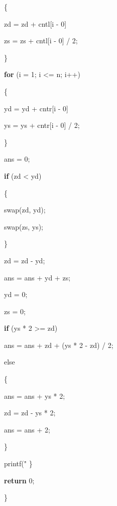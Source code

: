 \documentclass[]{ctexart}
\newenvironment{Shaded}{}{}
\newcommand{\ControlFlowTok}[1]{\textcolor[rgb]{0.00,0.44,0.13}{\textbf{#1}}}
\newcommand{\DecValTok}[1]{\textcolor[rgb]{0.25,0.63,0.44}{#1}}
\newcommand{\NormalTok}[1]{#1}
\newcommand{\SpecialCharTok}[1]{\textcolor[rgb]{0.25,0.44,0.63}{#1}}
\newcommand{\StringTok}[1]{\textcolor[rgb]{0.25,0.44,0.63}{#1}}
\begin{document}
\begin{Shaded}
\begin{Highlighting}[]
{}
\NormalTok{        \{
}
\NormalTok{            zd = zd + cntl[i - }\DecValTok{0}\NormalTok{] % }\DecValTok{2}\NormalTok{;
}
\NormalTok{            zs = zs + cntl[i - }\DecValTok{0}\NormalTok{] / }\DecValTok{2}\NormalTok{;
}
\NormalTok{        \}
}
        \ControlFlowTok{for}\NormalTok{ (i = }\DecValTok{1}\NormalTok{; i <= n; i++)
}
\NormalTok{        \{
}
\NormalTok{            yd = yd + cntr[i - }\DecValTok{0}\NormalTok{] % }\DecValTok{2}\NormalTok{;
}
\NormalTok{            ys = ys + cntr[i - }\DecValTok{0}\NormalTok{] / }\DecValTok{2}\NormalTok{;
}
\NormalTok{        \}
}
\NormalTok{        ans = }\DecValTok{0}\NormalTok{;
}
        \ControlFlowTok{if}\NormalTok{ (zd < yd)
}
\NormalTok{        \{
}
\NormalTok{            swap(zd, yd);
}
\NormalTok{            swap(zs, ys);
}
\NormalTok{        \}
}
\NormalTok{        zd = zd - yd;
}
\NormalTok{        ans = ans + yd + zs;
}
\NormalTok{        yd = }\DecValTok{0}\NormalTok{;
}
\NormalTok{        zs = }\DecValTok{0}\NormalTok{;
}
        \ControlFlowTok{if}\NormalTok{ (ys * }\DecValTok{2}\NormalTok{ >= zd)
}
\NormalTok{            ans = ans + zd + (ys * }\DecValTok{2}\NormalTok{ - zd) / }\DecValTok{2}\NormalTok{;
}
\NormalTok{        else
}
\NormalTok{        \{
}
\NormalTok{            ans = ans + ys * }\DecValTok{2}\NormalTok{;
}
\NormalTok{            zd = zd - ys * }\DecValTok{2}\NormalTok{;
}
\NormalTok{            ans = ans + }\DecValTok{2}\NormalTok{;
}
\NormalTok{        \}
}
\NormalTok{        printf(}\StringTok{"}\SpecialCharTok{%hd}\StringTok{"}\NormalTok{, ans);
}
\NormalTok{    \}
}
    \ControlFlowTok{return} \DecValTok{0}\NormalTok{;
}
\NormalTok{\}
}
\end{Highlighting}
\end{Shaded}
\end{document}
